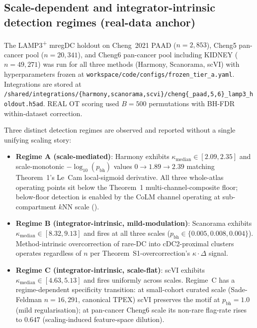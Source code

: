 
\subsection{Scale-dependent and integrator-intrinsic detection regimes (real-data anchor)}

The LAMP3\textsuperscript{+} mregDC holdout on Cheng~2021 PAAD ($n=2{,}853$), Cheng5 pan-cancer pool ($n=20{,}341$), and Cheng6 pan-cancer pool including KIDNEY ($n=49{,}271$) was run for all three methods (Harmony, Scanorama, scVI) with hyperparameters frozen at \texttt{workspace/code/configs/frozen\_tier\_a.yaml}. Integrations are stored at \texttt{/shared/integrations/\{harmony,scanorama,scvi\}/cheng\{\_paad,5,6\}\_lamp3\_holdout.h5ad}. REAL OT scoring used $B=500$ permutations with BH-FDR within-dataset correction.

Three distinct detection regimes are observed and reported without a single unifying scaling story:
\begin{itemize}\itemsep0pt
    \item \textbf{Regime A (scale-mediated)}: Harmony exhibits $\kappa_{\text{median}} \in [2.09, 2.35]$ and scale-monotonic $-\log_{10}(p_{\mathrm{bh}})$ values $0 \to 1.89 \to 2.39$ matching Theorem~1's Le~Cam local-sigmoid derivative. All three whole-atlas operating points sit below the Theorem~1 multi-channel-composite floor; below-floor detection is enabled by the CoLM channel operating at sub-compartment $k$NN scale ().
    \item \textbf{Regime B (integrator-intrinsic, mild-modulation)}: Scanorama exhibits $\kappa_{\text{median}} \in [8.32, 9.13]$ and fires at all three scales ($p_{\mathrm{bh}} \in \{0.005, 0.008, 0.004\}$). Method-intrinsic overcorrection of rare-DC into cDC2-proximal clusters operates regardless of $n$ per Theorem~S1-overcorrection's $\kappa\cdot\Delta$ signal.
    \item \textbf{Regime C (integrator-intrinsic, scale-flat)}: scVI exhibits $\kappa_{\text{median}} \in [4.63, 5.13]$ and fires uniformly across scales. Regime~C has a regime-dependent specificity transition: at small-cohort curated scale (Sade-Feldman $n=16{,}291$, canonical TPEX) scVI preserves the motif at $p_{\mathrm{bh}}=1.0$ (mild regularisation); at pan-cancer Cheng6 scale its non-rare flag-rate rises to $0.647$ (scaling-induced feature-space dilution).
\end{itemize}

